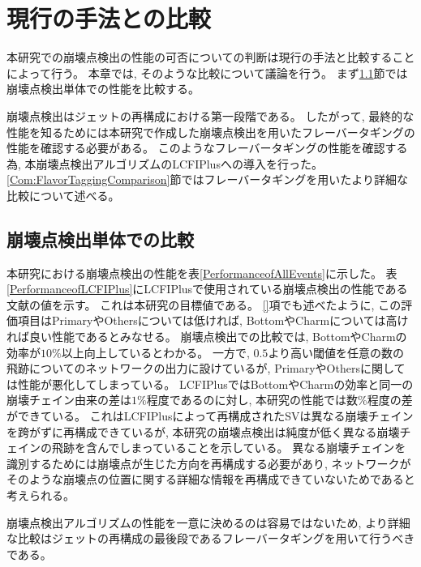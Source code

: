 
\chapter{現行の手法との比較} \label{chap:Comparison}

本研究での崩壊点検出の性能の可否についての判断は現行の手法と比較することによって行う。
本章では, そのような比較について議論を行う。
まず\ref{Com:ComparisonwithVF}節では崩壊点検出単体での性能を比較する。

崩壊点検出はジェットの再構成における第一段階である。
したがって, 最終的な性能を知るためには本研究で作成した崩壊点検出を用いたフレーバータギングの性能を確認する必要がある。
このようなフレーバータギングの性能を確認する為, 本崩壊点検出アルゴリズムのLCFIPlusへの導入を行った。
\ref{Com:FlavorTaggingComparison}節ではフレーバータギングを用いたより詳細な比較について述べる。


\section{崩壊点検出単体での比較} \label{Com:ComparisonwithVF}

本研究における崩壊点検出の性能を表\ref{PerformanceofAllEvents}に示した。
表\ref{PerformanceofLCFIPlus}にLCFIPlusで使用されている崩壊点検出の性能である文献\cite{LCFIPlusPaper}の値を示す。
これは本研究の目標値である。
\ref{}項でも述べたように, この評価項目はPrimaryやOthersについては低ければ, BottomやCharmについては高ければ良い性能であるとみなせる。
崩壊点検出での比較では, BottomやCharmの効率が$10\%$以上向上しているとわかる。
一方で, $0.5$より高い閾値を任意の数の飛跡についてのネットワークの出力に設けているが, PrimaryやOthersに関しては性能が悪化してしまっている。
LCFIPlusではBottomやCharmの効率と同一の崩壊チェイン由来の差は$1\%$程度であるのに対し, 本研究の性能では数\%程度の差ができている。
これはLCFIPlusによって再構成されたSVは異なる崩壊チェインを跨がずに再構成できているが, 本研究の崩壊点検出は純度が低く異なる崩壊チェインの飛跡を含んでしまっていることを示している。
異なる崩壊チェインを識別するためには崩壊点が生じた方向を再構成する必要があり, ネットワークがそのような崩壊点の位置に関する詳細な情報を再構成できていないためであると考えられる。

崩壊点検出アルゴリズムの性能を一意に決めるのは容易ではないため, より詳細な比較はジェットの再構成の最後段であるフレーバータギングを用いて行うべきである。

